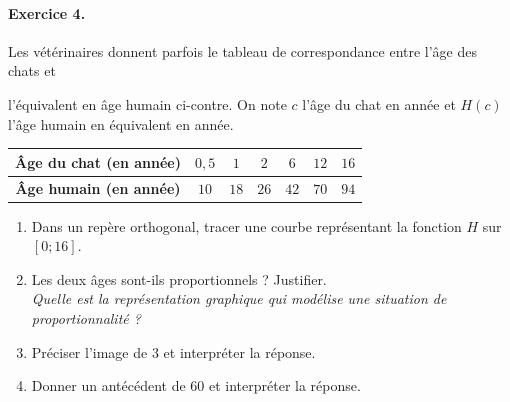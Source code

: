 \documentclass[11pt]{article}
\begin{document}
\paragraph{Exercice 4.} Les vétérinaires donnent parfois le tableau de
correspondance entre l'\^age des chats et 
\begin{minipage}[]{.4\textwidth}
l'équivalent en \^age humain ci-contre. On note $c$ l'\^age du chat en année et
$H(c)$ l'\^age humain en équivalent en année.
\end{minipage}
\begin{minipage}{.6\textwidth}
\begin{center}
\begin{tabular}{ccccccc}
  \toprule
  \textbf{\^Age du chat (en année)} & $0,5$ & $1$ & $2$ & $6$ & $12$ & $16$ \\
  \midrule
  \textbf{\^Age humain (en année)} & $10$ & $18$ & $26$ & $42$ & $70$ & $94$ \\
  \bottomrule
\end{tabular}
  \end{center}
\end{minipage}
\begin{enumerate}
  \item Dans un repère orthogonal, tracer une courbe représentant la fonction
    $H$ sur $[0;16]$.
  \item Les deux \^ages sont-ils proportionnels ? Justifier.\\\emph{Quelle est
    la représentation graphique qui modélise une situation de proportionnalité ?}
  \item Préciser l'image de $3$ et interpréter la réponse.
  \item Donner un antécédent de $60$ et interpréter la réponse.
\end{enumerate}
\end{document}
